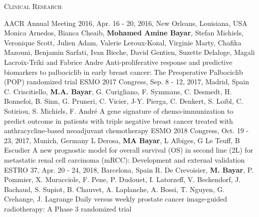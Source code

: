 \vspace*{-2em}
\textsc{{\color{accentcolor} Clinical Research}}
\vspace*{-.5em}
\begin{projects}
\paper
{AACR Annual Meeting 2016, Apr. 16 - 20, 2016, New Orleans, Louisiana, USA}
{}
{Monica Arnedos, Bianca Cheaib, \textbf{Mohamed Amine Bayar}, Stefan Michiels, Veronique Scott, Julien Adam, Valerie Leroux-Kozal, Virginie Marty, Chafika Mazouni, Benjamin Sarfati, Ivan Bieche, David Gentien, Suzette Delaloge, Magali Lacroix-Triki and Fabrice Andre}
{Anti-proliferative response and predictive biomarkers to palbociclib in early breast cancer: The Preoperative Palbociclib (POP) randomized trial}
\paper
{ESMO 2017 Congress, Sep. 8 - 12, 2017, Madrid, Spain}
{}
{C. Criscitiello, \textbf{M.A. Bayar}, G. Curigliano, F. Symmans, C. Desmedt, H. Bonnefoi, B. Sinn, G. Pruneri, C. Vicier, J-Y. Pierga, C. Denkert, S. Loibl, C. Sotiriou, S. Michiels, F. André}
{A gene signature of chemo-immunization to predict outcome in patients with triple negative breast cancer treated with anthracycline-based neoadjuvant chemotherapy}
\paper
{ESMO 2018 Congress, Oct. 19 - 23, 2017, Munich, Germany}
{}
{L Derosa, \textbf{MA Bayar}, L Albiges, G Le Teuff, B Escudier}
{A new prognostic model for overall survival (OS) in second line (2L) for metastatic renal cell carcinoma (mRCC): Development and external validation}
\pagebreak
\paper
{ESTRO 37, Apr. 20 - 24, 2018, Barcelona, Spain}
{}
{R. De Crevoisier, \textbf{M. Bayar}, P. Pommier, X. Muracciole, F. Pene, P. Dudouet, I. Latorzeff, V. Beckendorf, J. Bachaud, S. Supiot, B. Chauvet, A. Laplanche, A. Bossi, T. Nguyen, G. Crehange, J. Lagrange}
{Daily versus weekly prostate cancer image-guided radiotherapy: A Phase 3 randomized trial}
\end{projects}






